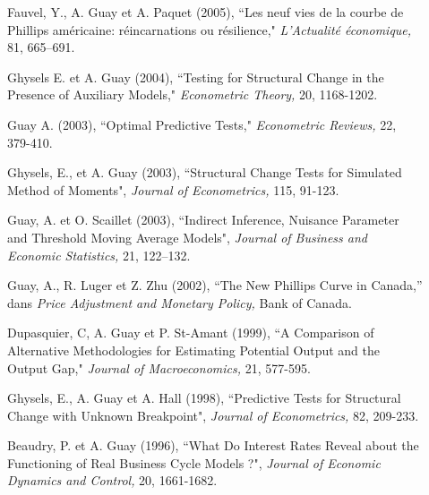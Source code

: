 \begin{description}
\item[] Fauvel, Y., A. Guay et A. Paquet (2005), ``Les neuf vies de la courbe de Phillips
am\'ericaine: r\'eincarnations ou r\'esilience," {\it L'Actualit\'e
\'economique,} 81, 665--691.


\item[] Ghysels E. et A. Guay (2004), ``Testing for Structural Change in the Presence of
Auxiliary Models," {\it Econometric Theory,} 20, 1168-1202.


\item[] Guay A. (2003), ``Optimal Predictive Tests," {\it
Econometric Reviews,} 22, 379-410.

\item[] Ghysels, E., et A. Guay (2003), ``Structural Change Tests for Simulated
Method of Moments", {\it Journal of Econometrics,} 115, 91-123.

\item[] Guay, A. et O. Scaillet (2003), ``Indirect Inference, Nuisance Parameter and
Threshold Moving Average Models", {\it Journal of Business and Economic Statistics,} 21, 122--132.

\item[] Guay, A., R. Luger et Z. Zhu (2002), ``The New Phillips Curve in Canada,''
dans {\it Price Adjustment and Monetary Policy,} Bank of Canada.

\item[] Dupasquier, C, A. Guay et P. St-Amant (1999), ``A Comparison of Alternative Methodologies for Estimating Potential Output and the Output Gap," {\it Journal of Macroeconomics,}  21, 577-595.

\item[] Ghysels, E., A. Guay et A. Hall (1998), ``Predictive Tests for Structural
Change with Unknown Breakpoint", {\it Journal of Econometrics,} 82, 209-233.

\item[] Beaudry, P. et A. Guay (1996), ``What Do Interest Rates Reveal about the
Functioning of Real Business Cycle Models ?", {\it Journal of Economic Dynamics and Control,} 20, 1661-1682.

\end{description}

